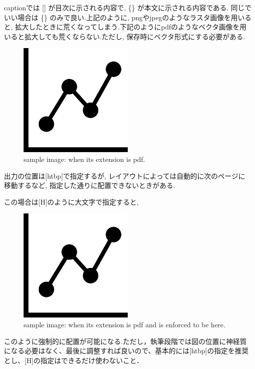     captionでは [] が目次に示される内容で, \{\} が本文に示される内容である. 同じでいい場合は \{\} のみで良い.上記のように, pngやjpegのようなラスタ画像を用いると, 拡大したときに荒くなってしまう.下記のようにpdfのようなベクタ画像を用いると拡大しても荒くならない.ただし, 保存時にベクタ形式にする必要がある.
    \begin{figure}[htbp]
        \centering   
        \includegraphics[width=0.5\textwidth]{img/appendix1/sample_pdf.pdf}
        \caption[sample image (pdf)]{sample image: when its extension is pdf.}
        \label{Fig:sample_pdf}
    \end{figure}
    出力の位置は[htbp]で指定するが, レイアウトによっては自動的に次のページに移動するなど, 指定した通りに配置できないときがある.
    
    この場合は[H]のように大文字で指定すると,
    \begin{figure}[H]
        \centering   
        \includegraphics[width=0.5\textwidth]{img/appendix1/sample_pdf.pdf}
        \caption[sample image (pdf, here)]{sample image: when its extension is pdf and is enforced to be here.}
        \label{Fig:sample_pdf_here}
    \end{figure}
    このように強制的に配置が可能になる.ただし，執筆段階では図の位置に神経質になる必要はなく、最後に調整すれば良いので、基本的には[htbp]の指定を推奨とし、[H]の指定はできるだけ使わないこと．

